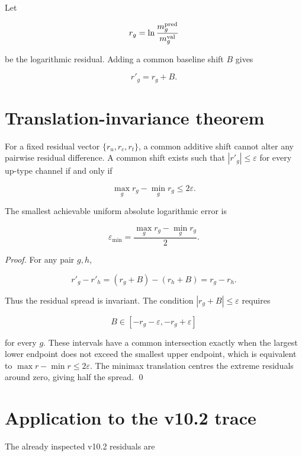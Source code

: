 Let

\begin{equation}
r_g=\ln\frac{m_g^{\rm pred}}{m_g^{\rm val}}
\label{eq:up_residual_definition}
\end{equation}

be the logarithmic residual.  Adding a common baseline shift $B$ gives

\begin{equation}
r'_g=r_g+B.
\label{eq:translated_up_residual}
\end{equation}

\section{Translation-invariance theorem}

\begin{theorem}
For a fixed residual vector $\{r_u,r_c,r_t\}$, a common additive shift cannot
alter any pairwise residual difference.  A common shift exists such that
$|r'_g|\leq\varepsilon$ for every up-type channel if and only if

\[
\max_g r_g-\min_g r_g\leq 2\varepsilon.
\]

The smallest achievable uniform absolute logarithmic error is

\[
\varepsilon_{\min}
=
\frac{\max_g r_g-\min_g r_g}{2}.
\]
\end{theorem}

\begin{proof}
For any pair $g,h$,

\[
r'_g-r'_h=(r_g+B)-(r_h+B)=r_g-r_h.
\]

Thus the residual spread is invariant.  The condition $|r_g+B|\leq\varepsilon$
requires

\[
B\in[-r_g-\varepsilon,-r_g+\varepsilon]
\]

for every $g$.  These intervals have a common intersection exactly when the
largest lower endpoint does not exceed the smallest upper endpoint, which is
equivalent to $\max r-\min r\leq2\varepsilon$.  The minimax translation centres
the extreme residuals around zero, giving half the spread.  \qed
\end{proof}

\section{Application to the v10.2 trace}

The already inspected v10.2 residuals are

